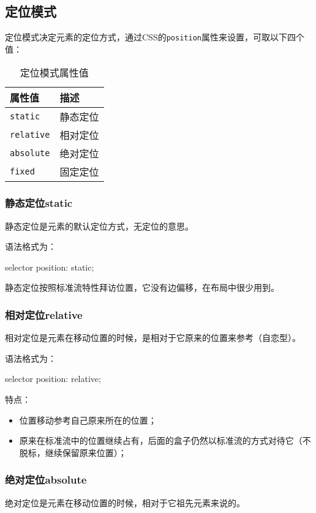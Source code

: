 \subsection{定位模式}
定位模式决定元素的定位方式，通过CSS的\verb|position|属性来设置，可取以下四个值：
\begin{table}[H]
    \centering
    \caption{定位模式属性值}
    \label{positioning mode}
    \begin{tabular}{ll}
        \hline
        属性值             & 描述   \\
        \hline
        \verb|static|   & 静态定位 \\
        \verb|relative| & 相对定位 \\
        \verb|absolute| & 绝对定位 \\
        \verb|fixed|    & 固定定位 \\
        \hline
    \end{tabular}
\end{table}
\subsubsection{静态定位static}
静态定位是元素的默认定位方式，无定位的意思。

语法格式为：
\begin{css}
    selector {
    position: static;
    }
\end{css}

静态定位按照标准流特性拜访位置，它没有边偏移，在布局中很少用到。

\subsubsection{相对定位relative}
相对定位是元素在移动位置的时候，是相对于它原来的位置来参考（自恋型）。

语法格式为：
\begin{css}
    selector {
    position: relative;
    }
\end{css}

特点：
\begin{itemize}
    \item 位置移动参考自己原来所在的位置；
    \item 原来在标准流中的位置继续占有，后面的盒子仍然以标准流的方式对待它（不脱标，继续保留原来位置）；
\end{itemize}
\subsubsection{绝对定位absolute}
绝对定位是元素在移动位置的时候，相对于它祖先元素来说的。


